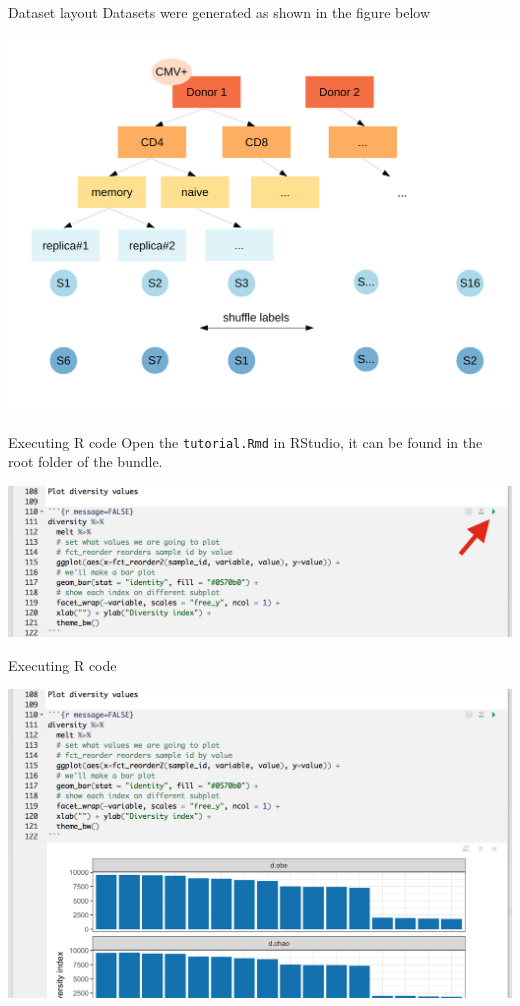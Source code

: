 \documentclass[12pt]{beamer}
\begin{document}
\begin{frame}{Dataset layout}
Datasets were generated as shown in the figure below
\begin{center}
\includegraphics[width=\textwidth]{p14}
\end{center}
\end{frame}

\begin{frame}{Executing R code}
Open the \texttt{tutorial.Rmd} in RStudio, it can be found in the root folder of the bundle.
\begin{center}
\includegraphics[width=\textwidth]{p8}
\end{center}
\end{frame}

\begin{frame}{Executing R code}
\begin{center}
\includegraphics[width=\textwidth]{p9}
\end{center}
\end{frame}
\end{document}
